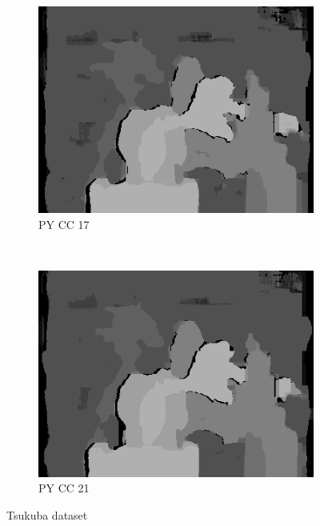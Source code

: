 \begin{figure}
\begin{subfigure}[b]{0.23\textwidth}
    \includegraphics[width=\textwidth]{images/stereo-pairs/tsukuba_pyramid_crosschecked_17.png}
    \caption{PY CC 17}
  \end{subfigure}
  ~
  \begin{subfigure}[b]{0.23\textwidth}
    \centering
    \includegraphics[width=\textwidth]{images/stereo-pairs/tsukuba_pyramid_crosschecked_21.png}
    \caption{PY CC 21}
  \end{subfigure}

  \caption{Tsukuba dataset}

\end{figure}

